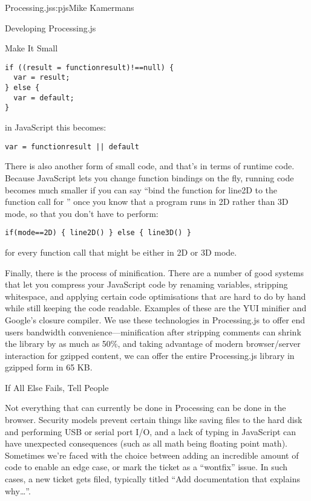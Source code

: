 \begin{aosachapter}{Processing.js}{s:pjs}{Mike Kamermans}
\begin{aosasect1}{Developing Processing.js}
\begin{aosasect2}{Make It Small}
\begin{verbatim}
if ((result = functionresult)!==null) {
  var = result;
} else {
  var = default;
}
\end{verbatim}

\noindent in JavaScript this becomes:

\begin{verbatim}
var = functionresult || default
\end{verbatim}

There is also another form of small code, and that's in terms of
runtime code. Because JavaScript lets you change function bindings on
the fly, running code becomes much smaller if you can say ``bind the
function for line2D to the function call for '' once you
know that a program runs in 2D rather than 3D mode, so that you don't
have to perform:

\begin{verbatim}
if(mode==2D) { line2D() } else { line3D() }
\end{verbatim}

\noindent for every function call that might be either in 2D or 3D mode.

Finally, there is the process of minification. There are a number of
good systems that let you compress your JavaScript code by
renaming variables, stripping whitespace, and applying certain code
optimisations that are hard to do by hand while still keeping the code
readable. Examples of these are the YUI minifier and Google's closure
compiler. We use these technologies in Processing.js to offer end
users bandwidth convenience---minification after stripping comments
can shrink the library by as much as 50\%, and taking advantage of
modern browser/server interaction for gzipped content, we can offer
the entire Processing.js library in gzipped form in 65 KB.

\end{aosasect2}

\begin{aosasect2}{If All Else Fails, Tell People}

Not everything that can currently be done in Processing can be done in
the browser. Security models prevent certain things like saving files
to the hard disk and performing USB or serial port I/O, and a lack of
typing in JavaScript can have unexpected consequences (such as all
math being floating point math). Sometimes we're faced with the choice
between adding an incredible amount of code to enable an edge case, or
mark the ticket as a ``wontfix'' issue. In such cases, a new ticket gets
filed, typically titled ``Add documentation that explains why\ldots''.


\end{aosasect2}
\end{aosasect1}
\end{aosachapter}
